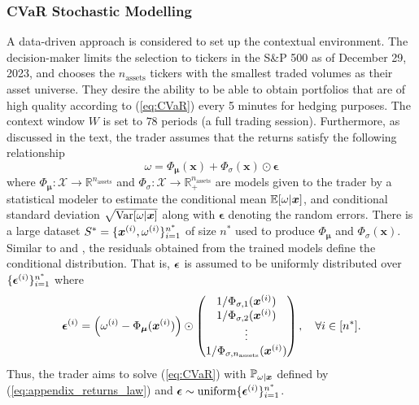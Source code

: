 \subsubsection{CVaR Stochastic Modelling} \label{appendix:cvar_data_generation}

A data-driven approach is considered to set up the contextual environment. The decision-maker limits the selection to tickers in the S\&P 500 as of December 29, 2023, and chooses the \(n_{\text{assets}}\) tickers with the smallest traded volumes as their asset universe. They desire the ability to be able to obtain portfolios that are of high quality according to (\ref{eq:CVaR}) every 5 minutes for hedging purposes. The context window $W$ is set to $78$ periods (a full trading session). Furthermore, as discussed in the text, the trader assumes that the returns satisfy the following relationship 
\begin{equation}\label{eq:appendix_returns_law}
\omega = \Phi_{\boldsymbol{\mu}}(\boldsymbol{x}) + \Phi_{\sigma} (\boldsymbol{x}) \odot \boldsymbol{\epsilon}
\end{equation}
where $\Phi_{\boldsymbol{\mu}} : \mathcal{X} \rightarrow \mathbb{R}^{n_{\text{assets}}}$ and $\Phi_{\sigma} : \mathcal{X} \rightarrow \mathbb{R}_+^{n_{\text{assets}}}$ are models given to the trader by a statistical modeler to estimate the conditional mean $\mathbb{E}[\omega |\boldsymbol{x}]$, and conditional standard deviation $\sqrt{\text{Var}[\omega | \boldsymbol{x}]}$ along with $\boldsymbol{\epsilon}$ denoting the random errors. There is a large dataset $S^* = \{\boldsymbol{x}^{(i)}, \omega^{(i)} \}_{i=1}^{n^*}$ of size $n^*$ used to produce $\Phi_{\boldsymbol{\mu}}$ and $\Phi_{\sigma} (\boldsymbol{x})$. Similar to \citet{deng2022predictive} and \citet{ban2019dynamic}, the residuals obtained from the trained models define the conditional distribution. That is, $\boldsymbol{\epsilon}$ is assumed to be uniformly distributed over $\{\boldsymbol{\epsilon}^{(i)}\}_{i=1}^{n^*}$ where 
\begin{equation}\label{eq:residuals}
\boldsymbol{\epsilon}^{(i)} = \left(\omega^{(i)} - \Phi_{\boldsymbol{\mu}}(\boldsymbol{x}^{(i)}) \right) \odot \begin{pmatrix}
    1/\Phi_{\sigma, 1} (\boldsymbol{x}^{(i)}) \\
    1/\Phi_{\sigma, 2} (\boldsymbol{x}^{(i)}) \\
    \vdots \\
    1/\Phi_{\sigma, n_{\text{assets}}} (\boldsymbol{x}^{(i)})
    \end{pmatrix}, \quad \forall i \in [n^*].
\end{equation}
Thus, the trader aims to solve (\ref{eq:CVaR}) with $\mathbb{P}_{\omega|\boldsymbol{x}}$ defined by (\ref{eq:appendix_returns_law}) and \hbox{$\boldsymbol{\epsilon} \sim \text{uniform} \{\boldsymbol{\epsilon}^{(i)}\}_{i=1}^{n^*}$}. 

